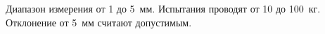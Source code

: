 Диапазон измерения от 1 до 5~мм.
Испытания проводят от 10 до 100~кг.
Отклонение от 5~мм считают допустимым.
